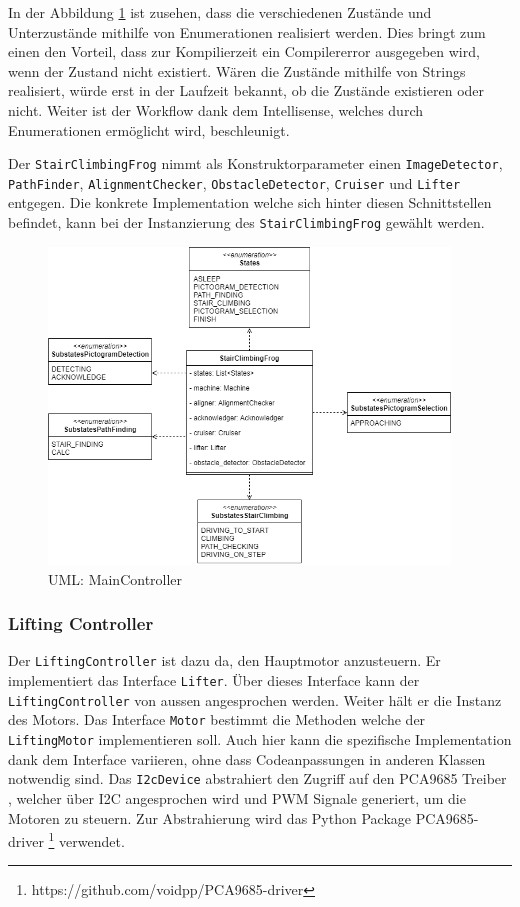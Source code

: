 In der Abbildung \ref{fig:uml-main} ist zusehen, dass die verschiedenen Zustände und Unterzustände mithilfe von Enumerationen realisiert werden. Dies bringt zum einen den Vorteil, dass zur Kompilierzeit ein Compilererror ausgegeben wird, wenn der Zustand nicht existiert. Wären die Zustände mithilfe von Strings realisiert, würde erst in der Laufzeit bekannt, ob die Zustände existieren oder nicht. Weiter ist der Workflow dank dem Intellisense, welches durch Enumerationen ermöglicht wird, beschleunigt.

Der \texttt{StairClimbingFrog} nimmt als Konstruktorparameter einen \texttt{ImageDetector}, \texttt{PathFinder}, \texttt{AlignmentChecker}, \texttt{ObstacleDetector}, \texttt{Cruiser} und \texttt{Lifter} entgegen. Die konkrete Implementation welche sich hinter diesen Schnittstellen befindet, kann bei der Instanzierung des \texttt{StairClimbingFrog} gewählt werden.

\begin{figure}[H]
  \includegraphics[width=0.95\textwidth]{img/softwarearchitektur/UML-MainController.png}
  \centering
  \caption{UML: MainController}
  \label{fig:uml-main}
\end{figure}

\newpage

\subsubsection{Lifting Controller}
Der \texttt{LiftingController} ist dazu da, den Hauptmotor anzusteuern. Er implementiert das Interface \texttt{Lifter}. Über dieses Interface kann der \texttt{LiftingController} von aussen angesprochen werden. Weiter hält er die Instanz des Motors. Das Interface \texttt{Motor} bestimmt die Methoden welche der \texttt{LiftingMotor} implementieren soll. Auch hier kann die spezifische Implementation dank dem Interface variieren, ohne dass Codeanpassungen in anderen Klassen notwendig sind. Das \texttt{I2cDevice} abstrahiert den Zugriff auf den PCA9685 Treiber \cite{pca9685-driver}, welcher über I2C angesprochen wird und PWM Signale generiert, um die Motoren zu steuern. Zur Abstrahierung wird das Python Package PCA9685-driver \footnote{https://github.com/voidpp/PCA9685-driver} verwendet.

